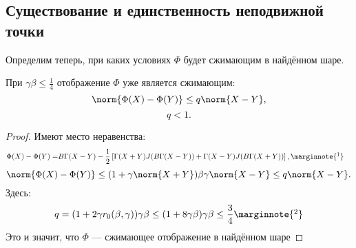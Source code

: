 \subsection{Существование и единственность неподвижной точки}
Определим теперь, при каких условиях \( \Phi \) будет сжимающим в найдённом шаре.
\begin{lemma}
    При \( \gamma\beta \leq \frac14 \) отображение \( \Phi \)
    уже является сжимающим:
    \[ \norm{\Phi(X)-\Phi(Y)} \leq q \norm{X-Y}, \]
    \[ q<1. \]
\end{lemma}
\begin{proof}
    Имеют место неравенства:
    \begin{align*}
        \Phi(X) - \Phi(Y) = & B\Gamma (X-Y) - \frac12 \left[
            \Gamma (X + Y)J(B\Gamma(X - Y)) + 
            \Gamma (X - Y)J(B\Gamma(X + Y))
        \right], \marginnote{\footnotemark}
    \end{align*}
    \[
        \norm{\Phi(X) - \Phi(Y)} \leq (1 + \gamma\norm{X+Y})\beta\gamma \norm{X-Y} \leq q\norm{X-Y}.
        \]
    Здесь:
    \begin{equation}\label{eq:lipconst}
        q = (1+2\gamma r_0(\beta,\gamma))\gamma\beta
        \leq (1+8\gamma\beta)\gamma\beta \leq \frac{3}{4}
        \marginnote{\footnotemark}
    \end{equation}
    Это и значит, что \( \Phi \) --- сжимающее отображение в найдённом шаре
\end{proof}

